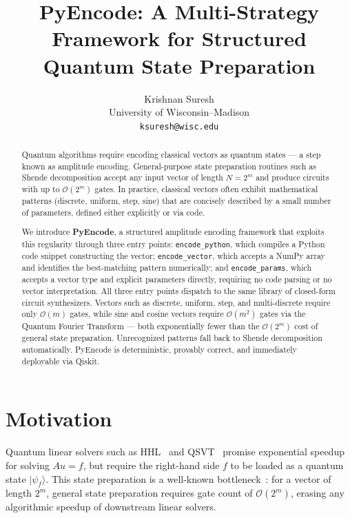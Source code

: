 \documentclass[10pt,twocolumn]{article}
\title{\textbf{PyEncode: A Multi-Strategy Framework for Structured Quantum State Preparation}}
\author{Krishnan Suresh\\
\small University of Wisconsin--Madison\\
\small \texttt{ksuresh@wisc.edu}}
\date{}
\newcommand{\ket}[1]{|#1\rangle}
\newcommand{\bigO}[1]{\mathcal{O}(#1)}
\begin{document}
\maketitle
\thispagestyle{empty}

\begin{abstract}
Quantum algorithms require encoding classical vectors as quantum states --- a step known as
amplitude encoding. General-purpose state preparation routines such
as Shende decomposition accept any input vector of length $N = 2^m$
and produce circuits with up to $\bigO{2^m}$ gates. In practice, classical vectors
often exhibit mathematical patterns (discrete, uniform, step, sine) that are
concisely described by a small number of parameters, defined either explicitly or via code.

We introduce \textbf{PyEncode}, a structured amplitude encoding framework that exploits this regularity through
three entry points: \texttt{encode\_python}, which compiles a Python code snippet
constructing the vector; \texttt{encode\_vector}, which accepts a
NumPy array and identifies the best-matching pattern numerically; and
\texttt{encode\_params}, which accepts a vector type and explicit parameters directly,
requiring no code parsing or no vector interpretation. All three entry points
dispatch to the same library of closed-form circuit synthesizers. Vectors such as
discrete, uniform, step, and multi-discrete require only $\bigO{m}$ gates, while
sine and cosine vectors require $\bigO{m^2}$ gates via the Quantum Fourier
Transform --- both exponentially fewer than the $\bigO{2^m}$ cost of general
state preparation. Unrecognized patterns fall back to Shende decomposition
automatically. PyEncode is deterministic, provably correct, and immediately
deployable via Qiskit.
\end{abstract}

\section{Motivation}
\label{sec:motivation}
Quantum linear solvers such as HHL~\cite{harrow2009} and
QSVT~\cite{gilyen2019quantum,martyn2021grand} promise exponential
speedup for solving $Au = f$, but require the right-hand side $f$
to be loaded as a quantum state $\ket{\psi_f}$. This state
preparation is a well-known bottleneck~\cite{aaronson2015}: for a vector  of length $2^m$,
general state preparation requires gate count of $\bigO{2^m}$,
erasing any algorithmic speedup of downstream linear solvers.
\end{document}
